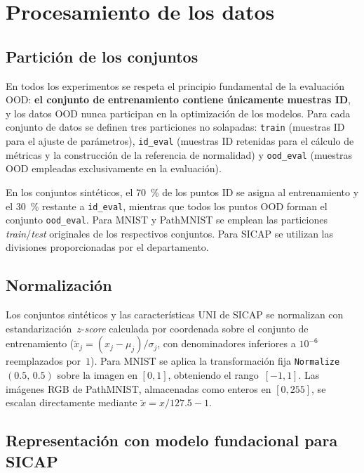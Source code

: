 \section{Procesamiento de los datos}
\label{sec:exp-pipeline}

\subsection{Partición de los conjuntos}

En todos los experimentos se respeta el principio fundamental de la evaluación OOD:
\textbf{el conjunto de entrenamiento contiene únicamente muestras ID}, y los datos
OOD nunca participan en la optimización de los modelos. Para cada conjunto de datos
se definen tres particiones no solapadas: \texttt{train} (muestras ID para el ajuste
de parámetros), \texttt{id\_eval} (muestras ID retenidas para el cálculo de métricas
y la construcción de la referencia de normalidad) y \texttt{ood\_eval} (muestras OOD
empleadas exclusivamente en la evaluación).

En los conjuntos sintéticos, el 70~\% de los puntos ID se asigna al entrenamiento
y el 30~\% restante a \texttt{id\_eval}, mientras que todos los puntos OOD forman el conjunto \texttt{ood\_eval}. Para MNIST y PathMNIST se emplean las particiones
\textit{train}/\textit{test} originales de los respectivos conjuntos. Para SICAP se
utilizan las divisiones proporcionadas por el departamento.

\subsection{Normalización}

Los conjuntos sintéticos y las características UNI de SICAP se normalizan con
estandarización~$z$-\textit{score} calculada por coordenada sobre el conjunto de
entrenamiento ($\tilde{x}_j = (x_j - \mu_j)/\sigma_j$, con denominadores
inferiores a $10^{-6}$ reemplazados por~$1$). Para MNIST se aplica la transformación
fija \texttt{Normalize}$(0.5,\,0.5)$ sobre la imagen en $[0,1]$, obteniendo el
rango~$[-1, 1]$. Las imágenes RGB de PathMNIST, almacenadas como enteros en
$[0, 255]$, se escalan directamente mediante $\tilde{x} = x/127.5 - 1$.

\subsection{Representación con modelo fundacional para SICAP}
\label{subsec:uni}

